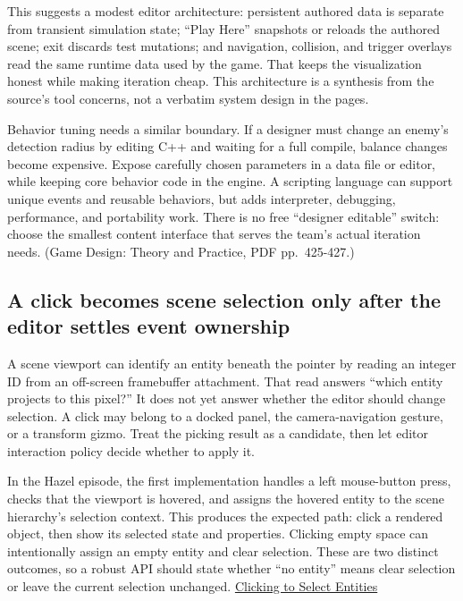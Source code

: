 This suggests a modest editor architecture: persistent authored data is separate from transient simulation state; ``Play Here'' snapshots or reloads the authored scene; exit discards test mutations; and navigation, collision, and trigger overlays read the same runtime data used by the game. That keeps the visualization honest while making iteration cheap. This architecture is a synthesis from the source's tool concerns, not a verbatim system design in the pages.

Behavior tuning needs a similar boundary. If a designer must change an enemy's detection radius by editing C++ and waiting for a full compile, balance changes become expensive. Expose carefully chosen parameters in a data file or editor, while keeping core behavior code in the engine. A scripting language can support unique events and reusable behaviors, but adds interpreter, debugging, performance, and portability work. There is no free ``designer editable'' switch: choose the smallest content interface that serves the team's actual iteration needs. (Game Design: Theory and Practice, PDF pp.~425-427.)

\subsection{A click becomes scene selection only after the editor settles event ownership}\label{06-engine-ii-ch032-a-click-becomes-scene-selection-only-after-the-editor-settles-event-ownership}

A scene viewport can identify an entity beneath the pointer by reading an integer ID from an off-screen framebuffer attachment. That read answers ``which entity projects to this pixel?'' It does not yet answer whether the editor should change selection. A click may belong to a docked panel, the camera-navigation gesture, or a transform gizmo. Treat the picking result as a candidate, then let editor interaction policy decide whether to apply it.

In the Hazel episode, the first implementation handles a left mouse-button press, checks that the viewport is hovered, and assigns the hovered entity to the scene hierarchy's selection context. This produces the expected path: click a rendered object, then show its selected state and properties. Clicking empty space can intentionally assign an empty entity and clear selection. These are two distinct outcomes, so a robust API should state whether ``no entity'' means clear selection or leave the current selection unchanged. \href{https://www.youtube.com/watch?v=CU9v3uUgRaE}{Clicking to Select Entities}

